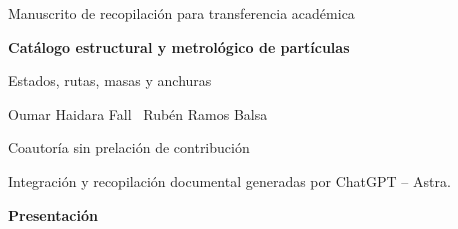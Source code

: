 \documentclass[a4paper,10pt]{article}
\begin{document}
\thispagestyle{empty}
\begin{center}
{\fontsize{8}{10}\selectfont Manuscrito de recopilación para transferencia académica\par}
\vspace{12mm}
{\fontsize{17}{20.5}\selectfont\bfseries Catálogo estructural y metrológico de partículas\par}
\vspace{6pt}
{\fontsize{11}{13.5}\selectfont Estados, rutas, masas y anchuras\par}
\vspace{11pt}
{\fontsize{11.5}{14}\selectfont Oumar Haidara Fall \textperiodcentered\ Rubén Ramos Balsa\par}
\vspace{4pt}
{\fontsize{8}{10}\selectfont Coautoría sin prelación de contribución\par}
\vspace{3pt}
{\fontsize{7.5}{9.5}\selectfont Integración y recopilación documental generadas por ChatGPT -- Astra.\par}
\end{center}
\vspace{7pt}
\begin{center}\bfseries Presentación\end{center}
\begingroup
\fontsize{10.5}{12.8}\selectfont
\setlength{\parskip}{2pt plus 1pt minus .5pt}
\noindent
\end{document}
